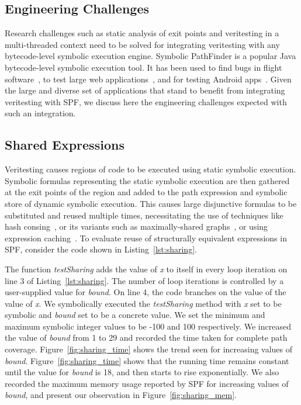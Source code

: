 \subsection{Engineering Challenges}
Research challenges such as static analysis of exit points and veritesting in a multi-threaded context need to be solved for integrating veritesting with any bytecode-level symbolic execution engine.
%
Symbolic PathFinder is a popular Java bytecode-level symbolic execution tool.
%
It has been used to find bugs in flight software~\cite{pasareanu2008}, to test large web applications~\cite{fujitsu}, and for testing Android apps~\cite{android_spf}.
%
%
Given the large and diverse set of applications that stand to benefit from integrating veritesting with SPF, we discuss here the engineering challenges expected with such an integration.

\subsection{Shared Expressions}
Veritesting causes regions of code to be executed using static symbolic execution.
%
Symbolic formulas representing the static symbolic execution are then gathered at the exit points of the region and added to the path expression and symbolic store of dynamic symbolic execution.
%
This causes large disjunctive formulas to be substituted and reused multiple times, necessitating the use of techniques like hash consing~\cite{hashconsing}, or its variants such as maximally-shared graphs~\cite{babic}, or using expression caching~\cite{green}.
%
To evaluate reuse of structurally equivalent expressions in SPF, consider the code shown in Listing~\ref{lst:sharing}.
%

%
The function \textit{testSharing} adds the value of \textit{x} to itself in every loop iteration on line 3 of Listing~\ref{lst:sharing}.
%
The number of loop iterations is controlled by a user-supplied value for \textit{bound}.
%
On line 4, the code branches on the value of the value of \textit{x}.
%
We symbolically executed the \textit{testSharing} method with \textit{x} set to be symbolic and \textit{bound} set to be a concrete value.
%
We set the minimum and maximum symbolic integer values to be -100 and 100 respectively.
%
We increased the value of \textit{bound} from 1 to 29 and recorded the time taken for complete path coverage.
%
Figure~\ref{fig:sharing_time} shows the trend seen for increasing values of \textit{bound}.
%
Figure~\ref{fig:sharing_time} shows that the running time remains constant until the value for \textit{bound} is 18, and then starts to rise exponentially.
%
We also recorded the maximum memory usage reported by SPF for increasing values of \textit{bound}, and present our observation in Figure~\ref{fig:sharing_mem}.

